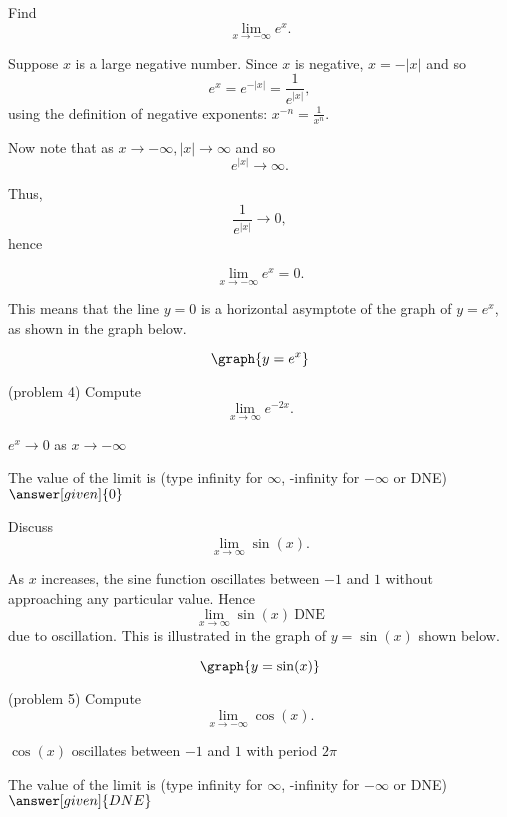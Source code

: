 \documentclass{ximera}
\begin{document}
\begin{example}[example 4]

Find 
\[
\lim_{x\to -\infty} e^x.
\]

Suppose $x$ is a large negative number.  Since $x$ is negative, $x = -|x|$ and so
\[
e^x = e^{-|x|} = \frac{1}{e^{|x|}},
\]
using the definition of negative exponents: $x^{-n} = \frac{1}{x^n}$.

Now note that as $x\to -\infty, |x| \to \infty$ and so 
\[
e^{|x|} \to \infty.
\]

Thus, 
\[
\frac{1}{e^{|x|}} \to 0,
\]
hence

\[
\lim_{x\to -\infty} e^x = 0.
\]

This means that the line $y=0$ is a horizontal asymptote of the graph of $y = e^x$,
as shown in the graph below.

\[
\graph{y=e^x}
\]

\end{example}

\begin{problem}(problem 4)
Compute 
\[ \lim_{x \to \infty} e^{-2x}.\]

\begin{hint}
$e^x \to 0$ as $x \to -\infty$
\end{hint}

The value of the limit is
		(type infinity for $\infty$, -infinity for $-\infty$ or DNE)
		 $\answer[given]{0}$
\end{problem}


\begin{example}[example 5]
Discuss
\[
\lim_{x\to \infty} \sin(x).
\]

As $x$ increases, the sine function oscillates between $-1$ and $1$ without approaching any particular value.
Hence
\[
\lim_{x\to \infty} \sin(x) \ \text{DNE}
\]
due to oscillation.
This is illustrated in the graph of $y=\sin(x)$ shown below.

\[
\graph{y=\sin(x)}
\]

\end{example}

\begin{problem}(problem 5)
Compute 
\[ \lim_{x \to -\infty} \cos(x).\]

\begin{hint}
$\cos(x)$ oscillates between $-1$ and $1$ with period $2\pi$
\end{hint}

The value of the limit is
		(type infinity for $\infty$, -infinity for $-\infty$ or DNE)
		 $\answer[given]{DNE}$
\end{problem}

\begin{center}
\begin{foldable}
\end{foldable}
\end{center}
\end{document}
